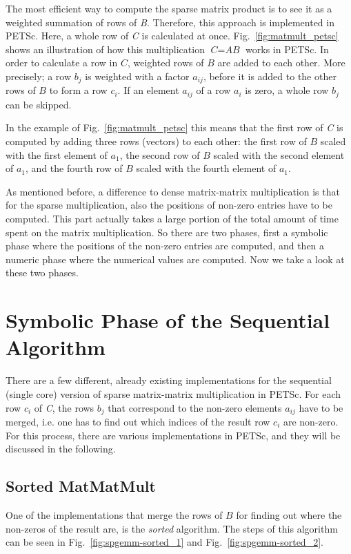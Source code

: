The most efficient way to compute the sparse matrix product is to see it as a weighted summation of rows of \textit{B}. Therefore, this approach is implemented in PETSc. Here, a whole row of \textit{C} is calculated at once. Fig.~\ref{fig:matmult_petsc} shows an illustration of how this multiplication $\textit{C} = \textit{AB}$ works in PETSc. In order to calculate a row in $\textit{C}$, weighted rows of $B$ are added to each other. More precisely; a row $b_j$ is weighted with a factor $a_{ij}$, before it is added to the other rows of $B$ to form a row $c_i$. If an element $a_{ij}$ of a row $a_i$ is zero, a whole row $b_j$ can be skipped. 

In the example of Fig.~\ref{fig:matmult_petsc} this means that the first row of \textit{C} is computed by adding three rows (vectors) to each other: the first row of $B$ scaled with the first element of $a_1$, the second row of $\textit{B}$ scaled with the second element of $a_1$, and the fourth row of $B$ scaled with the fourth element of $a_1$.


As mentioned before, a difference to dense matrix-matrix multiplication is that for the sparse multiplication, also the positions of non-zero entries have to be computed. This part actually takes a large portion of the total amount of time spent on the matrix multiplication. So there are two phases, first a symbolic phase where the positions of the non-zero entries are computed, and then a numeric phase where the numerical values are computed. Now we take a look at these two phases.



\section{Symbolic Phase of the Sequential Algorithm}
There are a few different, already existing implementations for the sequential (single core) version of sparse matrix-matrix multiplication in PETSc. For each row $c_i$ of \textit{C}, the rows $b_j$ that correspond to the non-zero elements $a_{ij}$ have to be merged, i.e. one has to find out which indices of the result row $c_i$ are non-zero. For this process, there are various implementations in PETSc, and they will be discussed in the following.


\subsection{Sorted MatMatMult}
One of the implementations that merge the rows of $B$ for finding out where the non-zeros of the result are, is the \textit{sorted} algorithm. The steps of this algorithm can be seen in Fig.~\ref{fig:spgemm-sorted_1} and Fig.~\ref{fig:spgemm-sorted_2}.

